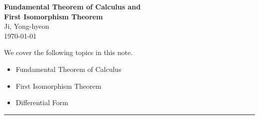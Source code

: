 \documentclass[11pt,openany]{article}
\begin{document}
\begin{center}
	\huge\textbf{Fundamental Theorem of Calculus and\\ First Isomorphism Theorem}\\
	\vspace{0.5em}
	\large{Ji, Yong-hyeon}\\
	\vspace{0.5em}
	\normalsize{\today}\\
\end{center}

\noindent 
We cover the following topics in this note.
\begin{itemize}
	\item Fundamental Theorem of Calculus
	\item First Isomorphism Theorem
	\item Differential Form
\end{itemize}
\hrule\vspace{12pt}
\end{document}
